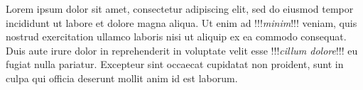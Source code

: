\documentclass{article}
\newcommand{\foo}[1]{!!!\textit{#1}!!!}
\begin{document}
Lorem ipsum dolor sit amet, consectetur adipiscing elit, sed do
eiusmod tempor incididunt ut labore et dolore magna aliqua.
Ut enim ad \foo{minim} veniam, quis nostrud exercitation ullamco laboris
nisi ut aliquip ex ea commodo consequat. Duis aute irure dolor in
reprehenderit in voluptate velit esse \foo{cillum dolore} eu fugiat nulla pariatur.
Excepteur sint occaecat cupidatat non proident,
sunt in culpa qui officia deserunt mollit anim id est laborum.
\end{document}

